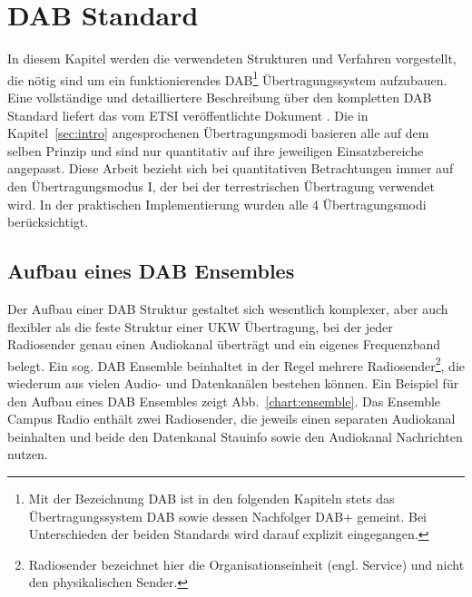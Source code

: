 \chapter{DAB Standard}
\label{sec:standard}
In diesem Kapitel werden die verwendeten Strukturen und Verfahren vorgestellt, die nötig sind um ein funktionierendes DAB\footnote{Mit der Bezeichnung DAB ist in den folgenden Kapiteln stets das Übertragungssystem DAB sowie dessen Nachfolger DAB+ gemeint. Bei Unterschieden der beiden Standards wird darauf explizit eingegangen.} Übertragungssystem aufzubauen. Eine vollständige und detailliertere Beschreibung über den kompletten DAB Standard liefert das vom \ac{ETSI} veröffentlichte Dokument \cite{etsi:dab_main}. Die in Kapitel~\ref{sec:intro} angesprochenen Übertragungsmodi basieren alle auf dem selben Prinzip und sind nur quantitativ auf ihre jeweiligen Einsatzbereiche angepasst. Diese Arbeit bezieht sich bei quantitativen Betrachtungen immer auf den Übertragungsmodus I, der bei der terrestrischen Übertragung verwendet wird. In der praktischen Implementierung wurden alle 4 Übertragungsmodi berücksichtigt.

\section{Aufbau eines DAB Ensembles}
Der Aufbau einer DAB Struktur gestaltet sich wesentlich komplexer, aber auch flexibler als die feste Struktur einer UKW Übertragung, bei der jeder Radiosender genau einen Audiokanal überträgt und ein eigenes Frequenzband belegt. Ein sog. DAB Ensemble beinhaltet in der Regel mehrere Radiosender\footnote{\glqq Radiosender\grqq{} bezeichnet hier die Organisationseinheit (engl. \glqq Service\grqq{}) und nicht den physikalischen Sender.}, die wiederum aus vielen Audio- und Datenkanälen bestehen können. Ein Beispiel für den Aufbau eines DAB Ensembles zeigt Abb.~\ref{chart:ensemble}. Das Ensemble \glqq Campus Radio\grqq{} enthält zwei Radiosender, die jeweils einen separaten Audiokanal beinhalten und beide den Datenkanal \glqq Stauinfo\grqq{} sowie den Audiokanal \glqq Nachrichten\grqq{} nutzen.\\

